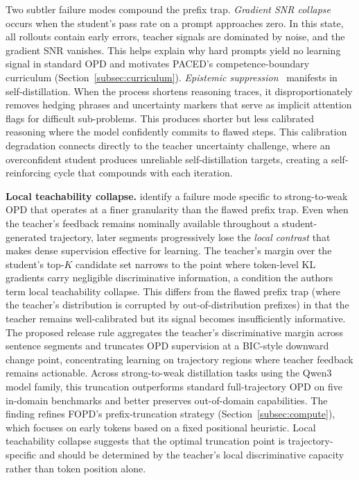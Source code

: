 \documentclass{article} %
\begin{document}
Two subtler failure modes compound the prefix trap. \emph{Gradient SNR collapse} occurs when the student's pass rate on a prompt approaches zero. In this state, all rollouts contain early errors, teacher signals are dominated by noise, and the gradient SNR vanishes. This helps explain why hard prompts yield no learning signal in standard OPD and motivates PACED's competence-boundary curriculum (Section~\ref{subsec:curriculum}). \emph{Epistemic suppression}~\citep{2603.24472} manifests in self-distillation. When the process shortens reasoning traces, it disproportionately removes hedging phrases and uncertainty markers that serve as implicit attention flags for difficult sub-problems. This produces shorter but less calibrated reasoning where the model confidently commits to flawed steps. This calibration degradation connects directly to the teacher uncertainty challenge, where an overconfident student produces unreliable self-distillation targets, creating a self-reinforcing cycle that compounds with each iteration.

\textbf{Local teachability collapse.} \citet{2605.13643} identify a failure mode specific to strong-to-weak OPD that operates at a finer granularity than the flawed prefix trap. Even when the teacher's feedback remains nominally available throughout a student-generated trajectory, later segments progressively lose the \emph{local contrast} that makes dense supervision effective for learning. The teacher's margin over the student's top-$K$ candidate set narrows to the point where token-level KL gradients carry negligible discriminative information, a condition the authors term local teachability collapse. This differs from the flawed prefix trap (where the teacher's distribution is corrupted by out-of-distribution prefixes) in that the teacher remains well-calibrated but its signal becomes insufficiently informative. The proposed release rule aggregates the teacher's discriminative margin across sentence segments and truncates OPD supervision at a BIC-style downward change point, concentrating learning on trajectory regions where teacher feedback remains actionable. Across strong-to-weak distillation tasks using the Qwen3 model family, this truncation outperforms standard full-trajectory OPD on five in-domain benchmarks and better preserves out-of-domain capabilities. The finding refines FOPD's prefix-truncation strategy (Section~\ref{subsec:compute}), which focuses on early tokens based on a fixed positional heuristic. Local teachability collapse suggests that the optimal truncation point is trajectory-specific and should be determined by the teacher's local discriminative capacity rather than token position alone.
\end{document}
